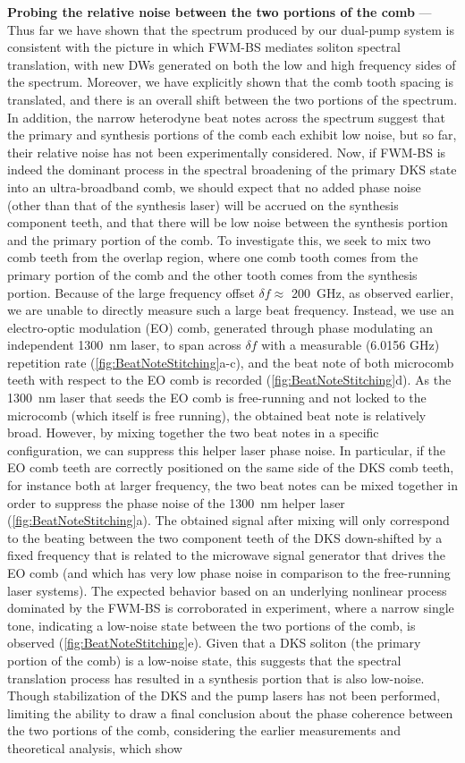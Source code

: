 \documentclass[reprint,superscriptaddress, amsmath,amssymb,pra, aps,floatfix,longbibliography]{revtex4-1}
\begin{document}
\noindent\textbf{Probing the relative noise between the two portions of the comb} — Thus far we have shown that the spectrum produced by our dual-pump system is consistent with the picture in which FWM-BS mediates soliton spectral translation, with new DWs generated on both the low and high frequency sides of the spectrum. Moreover, we have explicitly shown that the comb tooth spacing is translated, and there is an overall shift between the two portions of the spectrum. In addition, the narrow heterodyne beat notes across the spectrum suggest that the primary and synthesis portions of the comb each exhibit low noise, but so far, their relative noise has not been experimentally considered. Now, if FWM-BS is indeed the dominant process in the spectral broadening of the primary DKS state into an ultra-broadband comb, we should expect that no added phase noise (other than that of the synthesis laser) will be accrued on the synthesis component teeth, and that there will be low noise between the synthesis portion and the primary portion of the comb. To investigate this, we seek to mix two comb teeth from the overlap region, where one comb tooth comes from the primary portion of the comb and the other tooth comes from the synthesis portion. Because of the large frequency offset $\delta f\approx$ 200~GHz, as observed earlier, we are unable to directly measure such a large beat frequency. Instead, we use an electro-optic modulation (EO) comb, generated through phase modulating an independent 1300~nm laser, to span across $\delta f$ with a measurable (6.0156 GHz) repetition rate (\cref{fig:BeatNoteStitching}a-c), and the beat note of both microcomb teeth with respect to the EO comb is recorded (\cref{fig:BeatNoteStitching}d). As the 1300~nm laser that seeds the EO comb is free-running and not locked to the microcomb (which itself is free running), the obtained beat note is relatively broad. However, by mixing together the two beat notes in a specific configuration, we can suppress this helper laser phase noise. In particular, if the EO comb teeth are correctly positioned on the same side of the DKS comb teeth, for instance both at larger frequency, the two beat notes can be mixed together in order to suppress the phase noise of the 1300~nm helper laser (\cref{fig:BeatNoteStitching}a). The obtained signal after mixing will only correspond to the beating between the two component teeth of the DKS down-shifted by a fixed frequency that is related to the microwave signal generator that drives the EO comb (and which has very low phase noise in comparison to the free-running laser systems). The expected behavior based on an underlying nonlinear process dominated by the FWM-BS is corroborated in experiment, where a narrow single tone, indicating a low-noise state between the two portions of the comb, is observed (\cref{fig:BeatNoteStitching}e). Given that a DKS soliton (the primary portion of the comb) is a low-noise state, this suggests that the spectral translation process has resulted in a synthesis portion that is also low-noise. Though stabilization of the DKS and the pump lasers has not been performed, limiting the ability to draw a final conclusion about the phase coherence between the two portions of the comb, considering the earlier measurements and theoretical analysis, which show 
\end{document}
